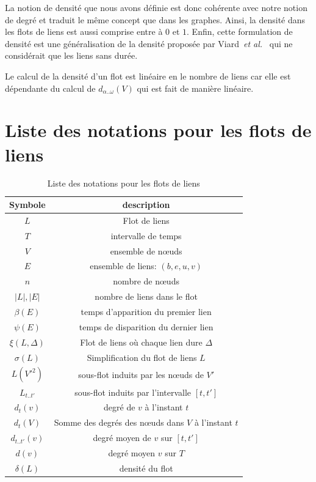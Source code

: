 La notion de densité que nous avons définie est donc cohérente avec notre notion de degré et traduit le même concept que dans les graphes.
Ainsi, la densité dans les flots de liens est aussi comprise entre à $0$ et $1$.
Enfin, cette formulation de densité est une généralisation de la densité proposée par Viard~\emph{et al.}~\cite{Viard2014a} qui ne considérait que les liens sans durée.

Le calcul de la densité d'un flot est linéaire en le nombre de liens car elle est dépendante du calcul de $d_{\alpha..\omega}(V)$  qui est fait de manière linéaire.
\clearpage
\section{Liste des notations pour les flots de liens}
\begin{table}[h]
	\centering
	\begin{tabular}{|c|c|}
	\hline Symbole & description \\
	\hline $L$ & Flot de liens \\ 
	$T$ & intervalle de temps  \\
	$V$ & ensemble de n\oe uds\\
	$E$ & ensemble de liens: $(b,e,u,v)$ \\
	$n$ & nombre de n\oe uds  \\
	$|L|,|E|$ & nombre de liens dans le flot \\
	$\beta(E)$ & temps d'apparition du premier lien\\
	$\psi(E)$ & temps de disparition du dernier lien\\
	$\xi(L,\Delta)$ & Flot de liens où chaque lien dure $\Delta$\\
	$\sigma(L)$ & Simplification du flot de liens $L$\\
	$L(V'^2)$ & sous-flot induits par les n\oe uds de $V'$ \\
	$L_{t..t'}$ & sous-flot induits par l'intervalle $[t,t']$ \\
	$d_t(v)$ & degré de $v$ à l'instant $t$\\
	$d_t(V)$ & Somme des degrés des n\oe uds dans $V$ à l'instant $t$\\
	$d_{t..t'}(v)$ & degré moyen de $v$ sur $[t,t']$\\
	$d(v)$ & degré moyen $v$ sur $T$\\
	$\delta(L)$ & densité du flot\\
	\hline
	\end{tabular} 
		\caption{Liste des notations pour les flots de liens}
\end{table}

